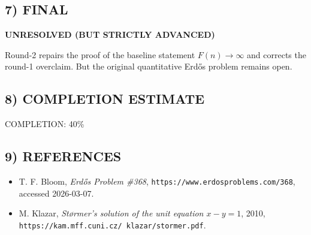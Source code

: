 \subsection*{7) FINAL}
\textbf{UNRESOLVED (BUT STRICTLY ADVANCED)}

Round-2 repairs the proof of the baseline statement $F(n)\to\infty$ and corrects the round-1 overclaim. But the original quantitative Erd\H{o}s problem remains open.

\subsection*{8) COMPLETION ESTIMATE}
COMPLETION: 40\%

\subsection*{9) REFERENCES}
\begin{itemize}
\item[Bloom368] T. F. Bloom, \emph{Erd\H{o}s Problem \#368}, \texttt{https://www.erdosproblems.com/368}, accessed 2026-03-07.
\item[Klazar] M. Klazar, \emph{St\o rmer's solution of the unit equation $x-y=1$}, 2010, \texttt{https://kam.mff.cuni.cz/~klazar/stormer.pdf}.
\end{itemize}
